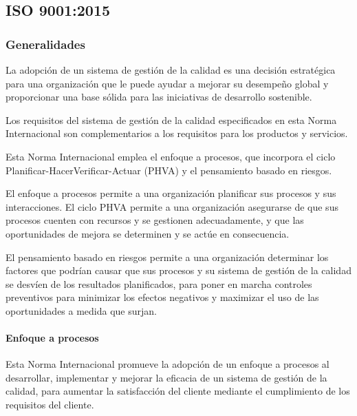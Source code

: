 \subsection{ISO 9001:2015}
	\subsubsection{Generalidades}
		\par 
			La adopción de un sistema de gestión de la calidad es una decisión estratégica para una organización
			que le puede ayudar a mejorar su desempeño global y proporcionar una base sólida para las iniciativas
			de desarrollo sostenible.
		
		\par \noindent
			Los requisitos del sistema de gestión de la calidad especificados en esta Norma Internacional son
			complementarios a los requisitos para los productos y servicios.
			
		\par \noindent
			Esta Norma Internacional emplea el enfoque a procesos, que incorpora el ciclo Planificar-HacerVerificar-Actuar (PHVA) y el pensamiento basado en riesgos.
			
		\par \noindent
			El enfoque a procesos permite a una organización planificar sus procesos y sus interacciones.
			El ciclo PHVA permite a una organización asegurarse de que sus procesos cuenten con recursos y se
			gestionen adecuadamente, y que las oportunidades de mejora se determinen y se actúe en consecuencia.
			
		\par \noindent
			El pensamiento basado en riesgos permite a una organización determinar los factores que podrían
			causar que sus procesos y su sistema de gestión de la calidad se desvíen de los resultados planificados,
			para poner en marcha controles preventivos para minimizar los efectos negativos y maximizar el uso
			de las oportunidades a medida que surjan.
			
	\paragraph{Enfoque a procesos}
	
		Esta Norma Internacional promueve la adopción de un enfoque a procesos al desarrollar, implementar
		y mejorar la eficacia de un sistema de gestión de la calidad, para aumentar la satisfacción del cliente
		mediante el cumplimiento de los requisitos del cliente.
	
